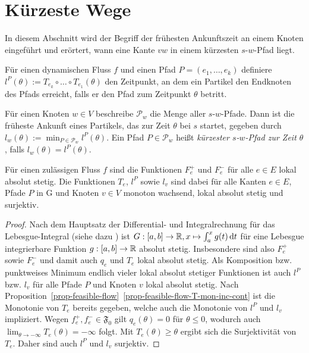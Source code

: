\chapter{Kürzeste Wege}\label{sec-travel-times}

In diesem Abschnitt wird der Begriff der frühesten Ankunftszeit an einem Knoten eingeführt und erörtert, wann eine Kante $vw$ in einem kürzesten $s$-$w$-Pfad liegt.

\begin{definition}
	Für einen dynamischen Fluss $f$ und einen Pfad $P=(e_1,\dots,e_k)$ definiere $l^P(\theta):=T_{e_k}\circ\dots\circ T_{e_1}(\theta)$ den Zeitpunkt, an dem ein Partikel den Endknoten des Pfads erreicht, falls er den Pfad zum Zeitpunkt $\theta$ betritt.
	
	Für einen Knoten $w\in V$ beschreibe $\mathcal{P}_w$ die Menge aller $s$-$w$-Pfade.
	Dann ist die früheste Ankunft eines Partikels, das zur Zeit $\theta$ bei $s$ startet, gegeben durch $l_w(\theta):=\min_{P\in\mathcal{P}_w}l^P(\theta)$.
	Ein Pfad $P\in \mathcal{P}_w$ heißt \emph{kürzester $s$-$w$-Pfad zur Zeit $\theta$}, falls $l_w(\theta)=l^P(\theta)$.
\end{definition}

\begin{proposition}\label{prop-abs-cont-sur}
	Für einen zulässigen Fluss $f$ sind die Funktionen $F_e^+$ und $F_e^-$ für alle $e\in E$ lokal absolut stetig.
	Die Funktionen $T_e$, $l^P$ sowie $l_v$ sind dabei für alle Kanten $e\in E$, Pfade $P$ in G und Knoten $v\in V$ monoton wachsend, lokal absolut stetig und surjektiv.
\end{proposition}
\begin{proof}
	Nach dem Hauptsatz der Differential- und Integralrechnung für das Lebesgue-Inte\-gral (siehe dazu \cite[Satz 4.14]{Elstrodt2011Abs}) ist $G: [a,b] \to \mathbb{R}, x\mapsto \int_a^x g(t) \mathop{}\!\mathrm{d} t$ für eine Lebesgue integrierbare Funktion $g: [a,b] \to \mathbb{R}$ absolut stetig.
	Insbesondere sind also $F_e^+$ sowie $F_e^-$ und damit auch $q_e$ und $T_e$ lokal absolut stetig.
	Als Komposition bzw. punktweises Minimum endlich vieler lokal absolut stetiger Funktionen ist auch $l^P$ bzw. $l_v$ für alle Pfade $P$ und Knoten $v$ lokal absolut stetig.
	Nach Proposition~\ref{prop-feasible-flow}~\ref{prop-feasible-flow-T-mon-inc-cont} ist die Monotonie von $T_e$ bereits gegeben, welche auch die Monotonie von $l^P$ und $l_v$ impliziert.
	Wegen $f_e^+, f_e^-\in\mathfrak{F_0}$ gilt $q_e(\theta)=0$ für $\theta\leq 0$, wodurch auch $\lim_{\theta\to-\infty} T_e(\theta) = - \infty$ folgt.
	Mit $T_e(\theta)\geq \theta$ ergibt sich die Surjektivität von $T_e$.
	Daher sind auch $l^P$ und $l_v$ surjektiv.
\end{proof}

